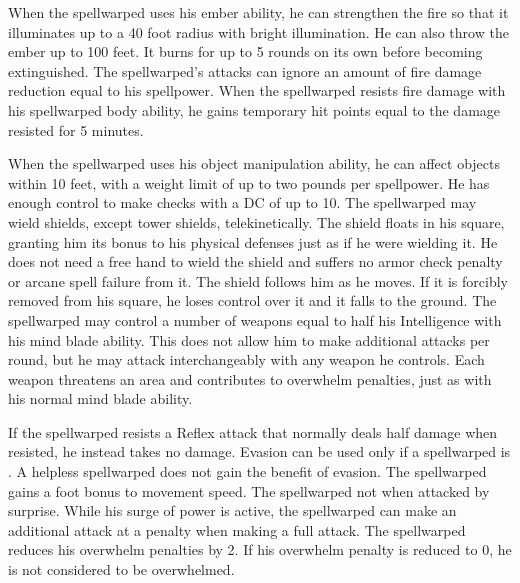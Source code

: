 When the spellwarped uses his ember ability, he can strengthen the fire so that it illuminates up to a 40 foot radius with bright illumination.
He can also throw the ember up to 100 feet.
It burns for up to 5 rounds on its own before becoming extinguished.
The spellwarped's attacks can ignore an amount of fire damage reduction equal to his spellpower.
When the spellwarped resists fire damage with his spellwarped body ability, he gains temporary hit points equal to the damage resisted for 5 minutes.

When the spellwarped uses his object manipulation ability, he can affect objects within 10 feet, with a weight limit of up to two pounds per spellpower.
He has enough control to make checks with a DC of up to 10.
The spellwarped may wield shields, except tower shields, telekinetically.
The shield floats in his square, granting him its bonus to his physical defenses just as if he were wielding it.
He does not need a free hand to wield the shield and suffers no armor check penalty or arcane spell failure from it.
The shield follows him as he moves.
If it is forcibly removed from his square, he loses control over it and it falls to the ground.
The spellwarped may control a number of weapons equal to half his Intelligence with his mind blade ability.
This does not allow him to make additional attacks per round, but he may attack interchangeably with any weapon he controls.
Each weapon threatens an area and contributes to overwhelm penalties, just as with his normal mind blade ability.

If the spellwarped resists a Reflex attack that normally deals half damage when resisted, he instead takes no damage.
Evasion can be used only if a spellwarped is \unencumbered.
A helpless spellwarped does not gain the benefit of evasion.
The spellwarped gains a  foot bonus to movement speed.
The spellwarped not \unaware when attacked by surprise.
While his surge of power is active, the spellwarped can make an additional attack at a  penalty when making a full attack.
The spellwarped reduces his overwhelm penalties by 2.
If his overwhelm penalty is reduced to 0, he is not considered to be overwhelmed.

